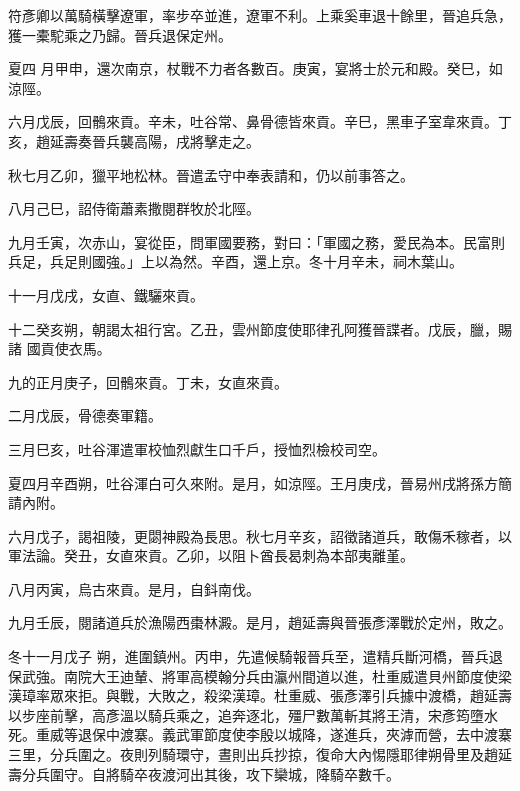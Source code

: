 \begin{pinyinscope}
 符彥卿以萬騎橫擊遼軍，率步卒並進，遼軍不利。上乘奚車退十餘里，晉追兵急，獲一橐駝乘之乃歸。晉兵退保定州。



 夏四
 月甲申，還次南京，杖戰不力者各數百。庚寅，宴將士於元和殿。癸巳，如涼陘。



 六月戊辰，回鶻來貢。辛未，吐谷常、鼻骨德皆來貢。辛巳，黑車子室韋來貢。丁亥，趙延壽奏晉兵襲高陽，戌將擊走之。



 秋七月乙卯，獵平地松林。晉遣孟守中奉表請和，仍以前事答之。



 八月己巳，詔侍衛蕭素撒閱群牧於北陘。



 九月壬寅，次赤山，宴從臣，問軍國要務，對曰：「軍國之務，愛民為本。民富則兵足，兵足則國強。」上以為然。辛酉，還上京。冬十月辛未，祠木葉山。



 十一月戊戌，女直、鐵驪來貢。



 十二癸亥朔，朝謁太祖行宮。乙丑，雲州節度使耶律孔阿獲晉諜者。戊辰，臘，賜諸
 國貢使衣馬。



 九的正月庚子，回鶻來貢。丁未，女直來貢。



 二月戊辰，骨德奏軍籍。



 三月巳亥，吐谷渾遣軍校恤烈獻生口千戶，授恤烈檢校司空。



 夏四月辛酉朔，吐谷渾白可久來附。是月，如涼陘。王月庚戌，晉易州戌將孫方簡請內附。



 六月戊子，謁祖陵，更閟神殿為長思。秋七月辛亥，詔徵諸道兵，敢傷禾稼者，以軍法論。癸丑，女直來貢。乙卯，以阻卜酋長曷刺為本部夷離堇。



 八月丙寅，烏古來貢。是月，自鈄南伐。



 九月壬辰，閱諸道兵於漁陽西棗林澱。是月，趙延壽與晉張彥澤戰於定州，敗之。



 冬十一月戊子
 朔，進圍鎮州。丙申，先遣候騎報晉兵至，遣精兵斷河橋，晉兵退保武強。南院大王迪輦、將軍高模翰分兵由瀛州間道以進，杜重威遣貝州節度使梁漢璋率眾來拒。與戰，大敗之，殺梁漢璋。杜重威、張彥澤引兵據中渡橋，趙延壽以步座前擊，高彥溫以騎兵乘之，追奔逐北，殭尸數萬斬其將王清，宋彥筠墮水死。重威等退保中渡寨。義武軍節度使李殷以城降，遂進兵，夾滹而營，去中渡寨三里，分兵圍之。夜則列騎環守，晝則出兵抄掠，復命大內惕隱耶律朔骨里及趙延壽分兵圍守。自將騎卒夜渡河出其後，攻下欒城，降騎卒數千。




\end{pinyinscope}
